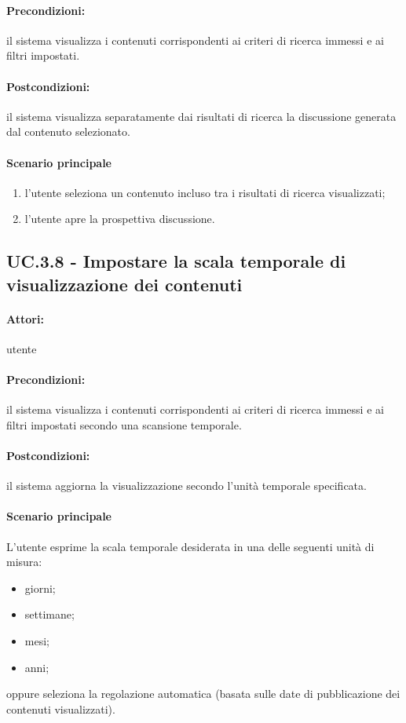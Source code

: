\documentclass[10pt,a4paper,headinclude,footinclude,hidelinks]{scrreprt} %
\begin{document}
	\paragraph{Precondizioni:} il sistema visualizza i contenuti corrispondenti ai criteri di ricerca immessi e ai filtri impostati.
	\paragraph{Postcondizioni:} il sistema visualizza separatamente dai risultati di ricerca la discussione generata dal contenuto selezionato.
	\paragraph{Scenario principale}
	\begin{enumerate}
	\item l'utente seleziona un contenuto incluso tra i risultati di ricerca visualizzati;
	\item l'utente apre la prospettiva discussione.
	\end{enumerate}

	\subsection[UC.3.7]{UC.3.8 - Impostare la scala temporale di visualizzazione dei contenuti}
	\label{sec:stage:ar:uc:3_}
	\paragraph{Attori:} utente
	\paragraph{Precondizioni:} il sistema visualizza i contenuti corrispondenti ai criteri di ricerca immessi e ai filtri impostati secondo una scansione temporale.
	\paragraph{Postcondizioni:} il sistema aggiorna la visualizzazione secondo l'unità temporale specificata.
	\paragraph{Scenario principale}
	L'utente esprime la scala temporale desiderata in una delle seguenti unità di misura:
	\begin{itemize}
	\item giorni;
	\item settimane;
	\item mesi;
	\item anni;
	\end{itemize}
	oppure seleziona la regolazione automatica (basata sulle date di pubblicazione dei contenuti visualizzati).
\end{document}
